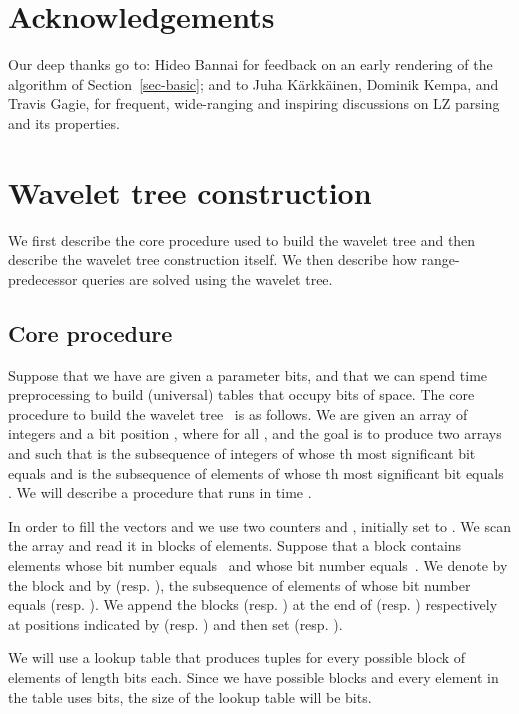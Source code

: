 \documentclass[11pt,runningheads]{llncs}
\begin{document}
{\section*{Acknowledgements} 
Our deep thanks go to: Hideo Bannai for feedback 
on an early rendering of the algorithm of Section~\ref{sec-basic};
and to Juha K{\"a}rkk{\"a}inen, Dominik Kempa, and Travis Gagie, for frequent,
wide-ranging and inspiring discussions on LZ parsing and its properties.

\newpage



\newpage
\appendix

\section{Wavelet tree construction}
\label{sec:wavelet_tree}
We first describe the core procedure used to build the wavelet tree and 
then describe the wavelet tree construction itself. We then describe
how range-predecessor queries are solved using the wavelet tree. 

\subsection{Core procedure}
\label{subsubsec:core_procedure}
Suppose that we have are given a parameter  bits, and that we 
can spend  time preprocessing to build (universal) tables that occupy  bits of space. 
The core procedure to build the wavelet tree~\cite{CP2010,MNV14,BGKS15} is as follows.
We are given an array of integers  and a bit position , where 
 for all , 
and the goal is to produce two arrays  and  
such that  is the subsequence of integers of  whose th 
most significant bit equals  and  is the subsequence of elements of  whose 
th most significant bit equals . We will describe a procedure that runs 
in time .

In order to fill the vectors 
and  we use two counters  and ,
initially set to . 
We scan the array  and read it in 
blocks of  elements. Suppose that 
a block contains  elements whose bit number  equals~
and  whose bit number  equals~. 
We denote by  the block and by  (resp. ), 
the subsequence of elements of  whose bit number  equals 
 (resp. ). We append the blocks  (resp. ) 
at the end of  (resp. ) respectively at positions 
indicated by  (resp. ) and then set 
(resp. ). 

We will use a lookup table  that produces tuples 
 for every possible 
block  of  elements of length  bits each. 
Since we have 
 possible blocks and every 
element in the table uses  bits, the size of the lookup table will 
be  bits. 

}
\end{document}
